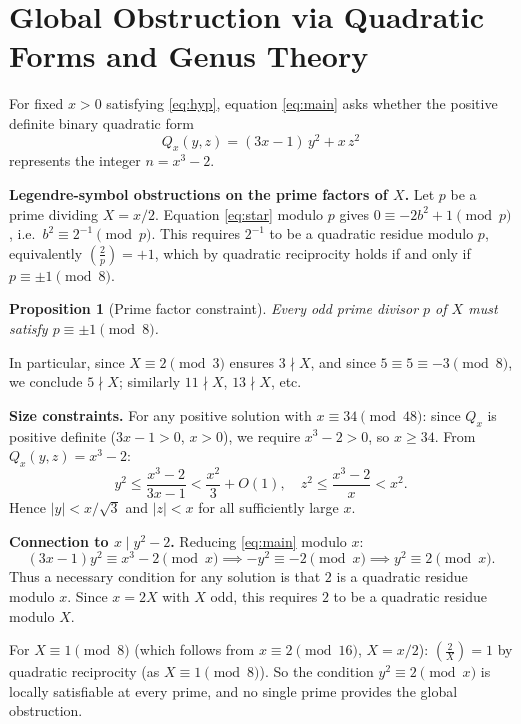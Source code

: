 \documentclass[12pt,a4paper]{article}
\newtheorem{proposition}[theorem]{Proposition}
\begin{document}
\section{Global Obstruction via Quadratic Forms and Genus Theory}
\label{sec:global}

For fixed $x > 0$ satisfying \eqref{eq:hyp}, equation \eqref{eq:main} asks
whether the positive definite binary quadratic form
\[
  Q_{x}(y,z) = (3x-1)\,y^2 + x\,z^2
\]
represents the integer $n = x^3 - 2$.

\textbf{Legendre-symbol obstructions on the prime factors of $X$.}
Let $p$ be a prime dividing $X = x/2$. Equation \eqref{eq:star} modulo $p$
gives $0 \equiv -2b^2 + 1 \pmod p$, i.e.\ $b^2 \equiv 2^{-1} \pmod p$.
This requires $2^{-1}$ to be a quadratic residue modulo $p$, equivalently
$\left(\tfrac{2}{p}\right) = +1$, which by quadratic reciprocity holds if and
only if $p \equiv \pm 1 \pmod 8$.

\begin{proposition}[Prime factor constraint]\label{prop:primefactor}
Every odd prime divisor $p$ of $X$ must satisfy $p \equiv \pm 1 \pmod 8$.
\end{proposition}

In particular, since $X \equiv 2 \pmod 3$ ensures $3 \nmid X$, and since $5
\equiv 5 \equiv -3 \pmod 8$, we conclude $5 \nmid X$; similarly $11 \nmid
X$, $13 \nmid X$, etc.

\textbf{Size constraints.}
For any positive solution with $x \equiv 34 \pmod{48}$: since $Q_x$ is
positive definite ($3x-1 > 0$, $x > 0$), we require $x^3 - 2 > 0$, so
$x \geq 34$. From $Q_x(y,z) = x^3-2$:
\[
  y^2 \leq \frac{x^3-2}{3x-1} < \frac{x^2}{3} + O(1), \quad
  z^2 \leq \frac{x^3-2}{x} < x^2.
\]
Hence $|y| < x/\sqrt{3}$ and $|z| < x$ for all sufficiently large $x$.

\textbf{Connection to $x \mid y^2 - 2$.}
Reducing \eqref{eq:main} modulo $x$:
\[
  (3x-1)y^2 \equiv x^3-2 \pmod x \implies -y^2 \equiv -2 \pmod x \implies
  y^2 \equiv 2 \pmod x.
\]
Thus a necessary condition for any solution is that $2$ is a quadratic
residue modulo $x$. Since $x = 2X$ with $X$ odd, this requires $2$ to be a
quadratic residue modulo $X$.

For $X \equiv 1 \pmod 8$ (which follows from $x \equiv 2 \pmod{16}$,
$X = x/2$): $\left(\tfrac{2}{X}\right) = 1$ by quadratic reciprocity
(as $X \equiv 1 \pmod 8$). So the condition $y^2 \equiv 2 \pmod x$ is
locally satisfiable at every prime, and no single prime provides the
global obstruction.
\end{document}
